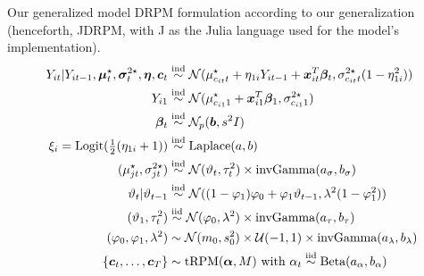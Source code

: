 \documentclass[
	11pt, %
 xcolor={dvipsnames,svgnames}
]{beamer}
\let\cite\citep
\newcommand\numberthis{\addtocounter{equation}{1}\tag{\theequation}}
\begin{document}
\begin{frame}{Our generalized model}
DRPM formulation according to our generalization (henceforth, JDRPM, with J as the Julia language used for the model's implementation). %
{\small
    \begin{align*}
Y_{it}|Y_{it-1},\vec{\mu}^{\star}_t,\vec{\sigma}^{2\star}_t, \vec{\eta},\vec{c}_t &\simind \mathcal{N}(\mu_{c_{it}t}^\star+\eta_{1i}Y_{it-1} + \vec{x}_{it}^T\vec{\beta}_t,\sigma^{2\star}_{c_{it}t}(1-\eta_{1i}^2)) \\
Y_{i1} &\simind \mathcal{N}(\mu^\star_{c_{i1}1}+ \vec{x}_{i1}^T\vec{\beta}_1,\sigma^{2\star}_{c_{i1}1})\\
%
\vec{\beta}_t & \simind \N_p(\vec{b},s^2 I)\\
\xi_i = \text{Logit$(\tfrac{1}{2}(\eta_{1i}+1)$}) &\simind \text{Laplace$(a,b)$}\\
%
( \mu_{jt}^\star, \sigma_{jt}^{2\star}) &\simind \N(\theta_t,\tau_t^2) \times \invgamma(a_\sigma,b_\sigma)\\
%
\theta_t | \theta_{t-1} &\simind \N((1-\phi_1)\phi_0 + \phi_1\theta_{t-1},\lambda^2(1-\phi_1^2))\\
%
(\theta_1,\tau_t^2) &\simiid \N(\phi_0,\lambda^2) \times  \invgamma (a_\tau,b_\tau)\\
%
(\phi_0,\phi_1,\lambda^2) &\sim \N(m_0,s_0^2) \times \U(-1,1) \times \invgamma (a_\lambda,b_\lambda)\\
%
\{\vec{c}_t, \ldots, \vec{c}_T\} &\sim \text{tRPM}(\vec{\alpha}, M) \text{ with } \alpha_t \simiid \text{Beta}(a_\alpha, b_\alpha)
\end{align*}
}
\end{frame}



\end{document}

